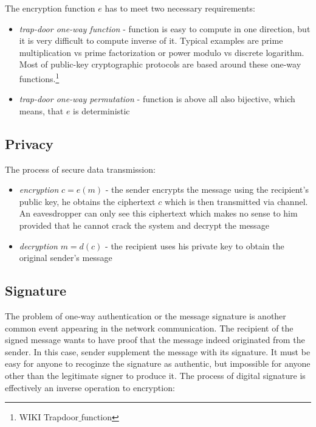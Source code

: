 \noindent
The encryption function $e$ has to meet two necessary requirements:

\begin{itemize}

\item \textit{trap-door one-way function} - function is easy to compute in one direction, but it is very difficult to compute inverse of it. Typical examples are prime multiplication vs prime factorization or power modulo vs discrete logarithm. Most of public-key cryptographic protocols are based around these one-way functions.\footnote{WIKI Trapdoor$\_$function}

\item \textit{trap-door one-way permutation} - function is above all also bijective, which means, that $e$ is deterministic 

\end{itemize}

\subsection*{Privacy}

The process of secure data transmission:

\begin{itemize}

\item \textit{encryption} $c = e(m)$ - the sender encrypts the message using the recipient's public key, he obtains the ciphertext $c$ which is then transmitted via channel. An eavesdropper can only see this ciphertext which makes no sense to him provided that he cannot crack the system and decrypt the message

\item \textit{decryption} $m = d(c)$ - the recipient uses his private key to obtain the original sender's message

\end{itemize}

\subsection*{Signature}

The problem of one-way authentication or the message signature is another common event appearing in the network communication. The recipient of the signed message wants to have proof that the message indeed originated from the sender. In this case, sender supplement the message with its signature. It must be easy for anyone to recoginze the signature as authentic, but impossible for anyone other than the legitimate signer to produce it. The process of digital signature is effectively an inverse operation to encryption:

